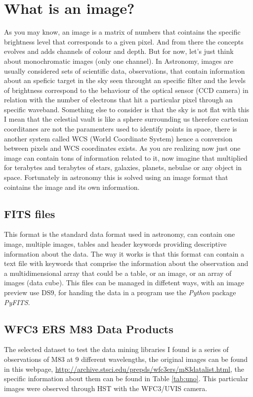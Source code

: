 \documentclass[11pt,fleqn]{book} %
\begin{document}
\section{What is an image?}
	As you may know, an image is a matrix of numbers that cointains the specific brightness level that corresponds to a given pixel. And from there the concepts evolves and adds channels of colour and depth. But for now, let's just think about monochromatic images (only one channel). In Astronomy, images are usually considered sets of scientific data, observations, that contain information about an speficic target in the sky seen throught an specific filter and the levels of brightness correspond to the behaviour of the optical sensor (CCD camera) in relation with the number of electrons that hit a particular pixel through an specific waveband. Something else to consider is that the sky is not flat with this I mean that the celestial vault is like a sphere surrounding us therefore cartesian coorditanes are not the paramenters used to identify points in space, there is another system called WCS (World Coordinate System) hence a conversion between pixels and WCS coordinates exists. As you are realizing now just one image can contain tons of information related to it, now imagine that multiplied for terabytes and terabytes of stars, galaxies, planets, nebulae or any object in space. Fortunately in astronomy this is solved using an image format that cointains the image and its own information.
	\subsection{FITS files}
    	This format is the standard data format used in astronomy, can contain one image, multiple images, tables and header keywords providing descriptive information about the data. The way it works is that this format can contain a text file with keywords that comprise the information about the observation and a multidimensional array that could be a table, or an image, or an array of images (data cube). This files can be managed in diffetent ways, with an image preview use DS9, for handing the data in a program use the \emph{Python} package \emph{PyFITS}.
        
	\subsection{WFC3 ERS M83 Data Products}
    The selected dataset to test the data mining libraries I found is a series of observations of M83 at 9 different wavelengths, the original images can be found in this webpage, \url{http://archive.stsci.edu/prepds/wfc3ers/m83datalist.html}, the specific information about them can be found in Table \ref{tab:uno}. This particular images were observed through HST with the WFC3/UVIS camera.
    
\end{document}
